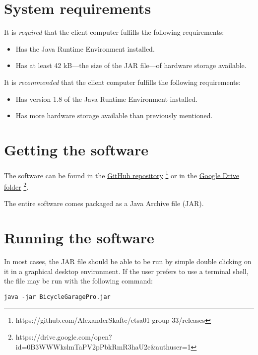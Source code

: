 \documentclass[12pt,titlepage]{article}
\begin{document}


\maketitle
\newpage
\tableofcontents
\thispagestyle{empty}
\setcounter{page}{0}
\newpage


\section{System requirements}

It is \textit{required} that the client computer fulfills the following
requirements:

\begin{itemize}
	\item Has the Java Runtime Environment installed.
	\item Has at least 42 kB---the size of the JAR file---of hardware
		storage available.
\end{itemize}

It is \textit{recommended} that the client computer fulfills the following
requirements:

\begin{itemize}
	\item Has version 1.8 of the Java Runtime Environment installed.
	\item Has more hardware storage available than previously mentioned.
\end{itemize}


\section{Getting the software}

The software can be found in the
\href{https://github.com/AlexanderSkafte/etsa01-group-33/releases}
{GitHub repository}
\footnote{https://github.com/AlexanderSkafte/etsa01-group-33/releases}
or in the
\href{https://drive.google.com/open?id=0B3WWWkslmTaPV2pPbkRmR3haU2c\&authuser=1}
{Google Drive folder}
\footnote{https://drive.google.com/open?id=0B3WWWkslmTaPV2pPbkRmR3haU2c\&authuser=1}.

The entire software comes packaged as a Java Archive file (JAR).


\section{Running the software}

In most cases, the JAR file should be able to be run by simple double clicking
on it in a graphical desktop environment. If the user prefers to use a terminal
shell, the file may be run with the following command:

\texttt{java -jar BicycleGaragePro.jar}
\end{document}
